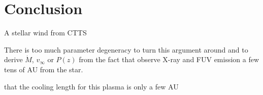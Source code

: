 \section{Conclusion}
\label{sect:conclusion}
A stellar wind from CTTS 

There is too much parameter degeneracy to turn this argument around and to derive $\dot M$, $v_\infty$ or $P(z)$ from the fact that observe X-ray and FUV emission a few tens of AU from the star.


\citet{2009A&A...493..579G} 
\citep{2000ApJ...537L..49B}

that the cooling length for this plasma is only a few AU 
